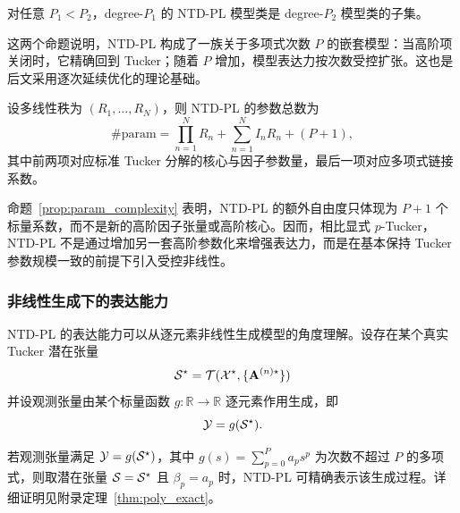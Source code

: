 \begin{proposition}[次数嵌套性]
\label{prop:nested_model_family}
对任意 $P_1<P_2$，degree-$P_1$ 的 NTD-PL 模型类是 degree-$P_2$ 模型类的子集。
\end{proposition}

这两个命题说明，NTD-PL 构成了一族关于多项式次数 $P$ 的嵌套模型：当高阶项关闭时，它精确回到 Tucker；随着 $P$ 增加，模型表达力按次数受控扩张。这也是后文采用逐次延续优化的理论基础。

\begin{proposition}[参数复杂度]
\label{prop:param_complexity}
设多线性秩为 $(R_1,\dots,R_N)$，则 NTD-PL 的参数总数为
\begin{equation}
\#\mathrm{param}
=
\prod_{n=1}^{N}R_n
+
\sum_{n=1}^{N}I_nR_n
+
(P+1),
\label{eq:ntdpl_param_count_main}
\end{equation}
其中前两项对应标准 Tucker 分解的核心与因子参数量，最后一项对应多项式链接系数。
\end{proposition}

命题~\ref{prop:param_complexity} 表明，NTD-PL 的额外自由度只体现为 $P+1$ 个标量系数，而不是新的高阶因子张量或高阶核心。因而，相比显式 $p$-Tucker，NTD-PL 不是通过增加另一套高阶参数化来增强表达力，而是在基本保持 Tucker 参数规模一致的前提下引入受控非线性。

\subsubsection{非线性生成下的表达能力}

NTD-PL 的表达能力可以从逐元素非线性生成模型的角度理解。设存在某个真实 Tucker 潜在张量
\begin{equation}
\mathcal{S}^\star
=
\mathcal{T}(\mathcal{X^\star},\{\mathbf{A}^{(n)\star}\})
\end{equation}
并设观测张量由某个标量函数 $g:\mathbb R\to\mathbb R$ 逐元素作用生成，即
\begin{equation}
\mathcal{Y} = g(\mathcal{S}^\star).
\end{equation}

\begin{proposition}[多项式生成下的精确表达]
\label{prop:poly_exact_main}
若观测张量满足 $\mathcal{Y} = g(\mathcal{S}^\star)$，其中 $g(s)=\sum_{p=0}^{P} a_p s^p$ 为次数不超过 $P$ 的多项式，则取潜在张量 $\mathcal{S}=\mathcal{S}^\star$ 且 $\beta_p=a_p$ 时，NTD-PL 可精确表示该生成过程。详细证明见附录定理~\ref{thm:poly_exact}。
\end{proposition}

